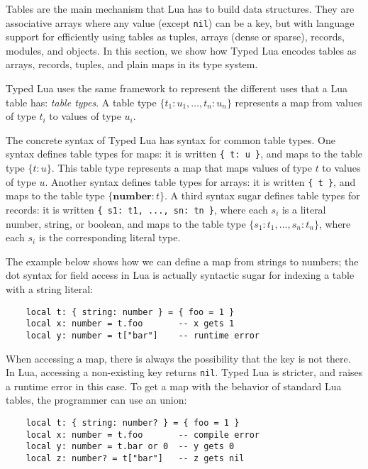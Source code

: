 \documentclass[preprint]{sig-alternate}
\newcommand{\Number}{\mathbf{number}}
\begin{document}
Tables are the main mechanism that Lua has to build data
structures. They are associative arrays where any value
(except {\tt nil}) can be a key, but with language support
for efficiently using tables as tuples, arrays (dense or sparse),
records, modules, and objects. In this section,
we show how Typed Lua encodes tables as arrays, records, tuples,
and plain maps in its type system.

Typed Lua uses the same framework to represent the different
uses that a Lua table has: {\em table types}. A table type
$\{ t_{1}:u_{1}, \ldots, t_{n}:u_{n}\}$ represents a map
from values of type $t_i$ to values of type $u_i$.

The concrete syntax of Typed Lua has syntax for
common table types. One syntax defines table types for
maps: it is written \texttt{\{ t: u \}},
and maps to the table type $\{t:u\}$.
This table type represents a map that maps values of type
$t$ to values of type $u$.
Another syntax defines table types for arrays:
it is written \texttt{\{ t \}}, and maps to the table type
$\{\Number:t\}$. A third syntax sugar defines
table types for records:
it is written \texttt{\{ s1: t1, ..., sn: tn \}}, where
each $s_i$ is a literal number, string, or boolean, 
and maps to the table type $\{s_{1}:t_{1}, ..., s_{n}:t_{n}\}$,
where each $s_i$ is the corresponding literal type.

The example below shows how we can define a map from
strings to numbers; the dot syntax for field access
in Lua is actually syntactic sugar for indexing a table
with a string literal:

\begin{verbatim}
    local t: { string: number } = { foo = 1 }
    local x: number = t.foo       -- x gets 1
    local y: number = t["bar"]    -- runtime error
\end{verbatim}

When accessing a map, there is always the possibility that
the key is not there. In Lua, accessing a non-existing key
returns {\tt nil}. Typed Lua is stricter, and raises a runtime
error in this case. To get a map with the behavior of standard
Lua tables, the programmer can use an union:

\begin{verbatim}
    local t: { string: number? } = { foo = 1 }
    local x: number = t.foo       -- compile error
    local y: number = t.bar or 0  -- y gets 0
    local z: number? = t["bar"]   -- z gets nil
\end{verbatim}
\end{document}
